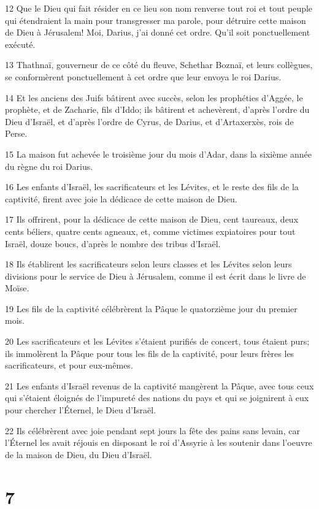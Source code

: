 \par 12 Que le Dieu qui fait résider en ce lieu son nom renverse tout roi et tout peuple qui étendraient la main pour transgresser ma parole, pour détruire cette maison de Dieu à Jérusalem! Moi, Darius, j'ai donné cet ordre. Qu'il soit ponctuellement exécuté.
\par 13 Thathnaï, gouverneur de ce côté du fleuve, Schethar Boznaï, et leurs collègues, se conformèrent ponctuellement à cet ordre que leur envoya le roi Darius.
\par 14 Et les anciens des Juifs bâtirent avec succès, selon les prophéties d'Aggée, le prophète, et de Zacharie, fils d'Iddo; ils bâtirent et achevèrent, d'après l'ordre du Dieu d'Israël, et d'après l'ordre de Cyrus, de Darius, et d'Artaxerxès, rois de Perse.
\par 15 La maison fut achevée le troisième jour du mois d'Adar, dans la sixième année du règne du roi Darius.
\par 16 Les enfants d'Israël, les sacrificateurs et les Lévites, et le reste des fils de la captivité, firent avec joie la dédicace de cette maison de Dieu.
\par 17 Ils offrirent, pour la dédicace de cette maison de Dieu, cent taureaux, deux cents béliers, quatre cents agneaux, et, comme victimes expiatoires pour tout Israël, douze boucs, d'après le nombre des tribus d'Israël.
\par 18 Ils établirent les sacrificateurs selon leurs classes et les Lévites selon leurs divisions pour le service de Dieu à Jérusalem, comme il est écrit dans le livre de Moïse.
\par 19 Les fils de la captivité célébrèrent la Pâque le quatorzième jour du premier mois.
\par 20 Les sacrificateurs et les Lévites s'étaient purifiés de concert, tous étaient purs; ils immolèrent la Pâque pour tous les fils de la captivité, pour leurs frères les sacrificateurs, et pour eux-mêmes.
\par 21 Les enfants d'Israël revenus de la captivité mangèrent la Pâque, avec tous ceux qui s'étaient éloignés de l'impureté des nations du pays et qui se joignirent à eux pour chercher l'Éternel, le Dieu d'Israël.
\par 22 Ils célébrèrent avec joie pendant sept jours la fête des pains sans levain, car l'Éternel les avait réjouis en disposant le roi d'Assyrie à les soutenir dans l'oeuvre de la maison de Dieu, du Dieu d'Israël.

\chapter{7}

